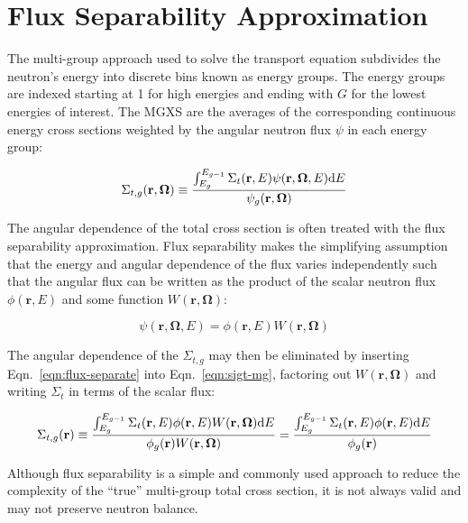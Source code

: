 \section{Flux Separability Approximation}
\label{sec:flux-separability}

The multi-group approach used to solve the transport equation subdivides the neutron's energy into discrete bins known as energy groups. The energy groups are indexed starting at 1 for high energies and ending with $G$ for the lowest energies of interest. The MGXS are the averages of the corresponding continuous energy cross sections weighted by the angular neutron flux $\psi$ in each energy group:

\begin{dmath}
\label{eqn:sigt-mg}
\Sigma_{t,g}(\mathbf{r},\mathbf{\Omega}) \equiv \frac{\int\displaylimits_{E_{g}}^{E_{g-1}} \Sigma_{t}(\mathbf{r},E)\psi(\mathbf{r},\mathbf{\Omega},E)\mathrm{d}E}{\psi_{g}(\mathbf{r},\mathbf{\Omega})}
\end{dmath}

The angular dependence of the total cross section is often treated with the flux separability approximation. Flux separability makes the simplifying assumption that the energy and angular dependence of the flux varies independently such that the angular flux can be written as the product of the scalar neutron flux $\phi(\mathbf{r},E)$ and some function $W(\mathbf{r}, \mathbf{\Omega})$:

\begin{dmath}
\label{eqn:flux-separate}
\psi(\mathbf{r},\mathbf{\Omega},E) = \phi(\mathbf{r},E) W(\mathbf{r},\mathbf{\Omega})
\end{dmath}

\noindent The angular dependence of the $\Sigma_{t,g}$ may then be eliminated by inserting Eqn.~\ref{eqn:flux-separate} into Eqn.~\ref{eqn:sigt-mg}, factoring out $W(\mathbf{r},\mathbf{\Omega})$ and writing $\Sigma_{t}$ in terms of the scalar flux:

\begin{dmath}
\label{eqn:sigt-mg-scalar}
\Sigma_{t,g}(\mathbf{r}) \equiv \frac{\int\displaylimits_{E_{g}}^{E_{g-1}} \Sigma_{t}(\mathbf{r},E)\phi(\mathbf{r},E)W(\mathbf{r},\mathbf{\Omega})\mathrm{d}E}{\phi_{g}(\mathbf{r})W(\mathbf{r},\mathbf{\Omega})} = \frac{\int\displaylimits_{E_{g}}^{E_{g-1}} \Sigma_{t}(\mathbf{r},E)\phi(\mathbf{r},E)\mathrm{d}E}{\phi_{g}(\mathbf{r})}
\end{dmath}

Although flux separability is a simple and commonly used approach to reduce the complexity of the ``true'' multi-group total cross section, it is not always valid and may not preserve neutron balance.
